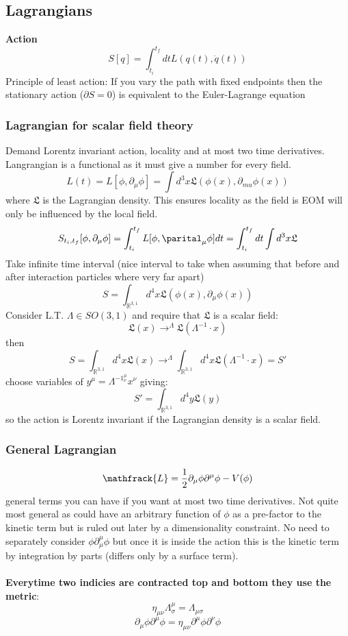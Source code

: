 \documentclass[12pt, a4paper, twoside, titlepage]{article}
\begin{document}
\subsection{Lagrangians}
\textbf{Action}
$$
S[q] = \int_{t_i}^{t_f} dt L(q(t),\dot q(t))
$$
Principle of least action: If you vary the path with fixed endpoints then the stationary action ($\partial S = 0$) is equivalent to the Euler-Lagrange equation
\subsubsection{Lagrangian for scalar field theory}
Demand Lorentz invariant action, locality and at most two time derivatives. Langrangian is a functional as it must give a number for every field.
$$
L(t) = L[\phi, \partial_{\mu} \phi] = \int d^3x \mathfrak{L}(\phi(x),\partial_{mu}\phi(x))
$$
where $\mathfrak{L}$ is the Lagrangian density. This ensures locality as the field is EOM will only be influenced by the local field.
$$
S_{t_i,t_f}[\phi, \partial_{\mu}\phi] = \int_{t_i}^{t_f} L[\phi, \parital_{\mu}\phi] dt = \int_{t_i}^{t_f} dt \int d^3x \mathfrak{L}
$$
Take infinite time interval (nice interval to take when assuming that before and after interaction particles where very far apart)
$$
S = \int_{\mathbb{R}^{3,1}} d^4x \mathfrak{L} (\phi(x), \partial_{\mu}\phi(x))
$$
Consider L.T. $\Lambda \in SO(3,1)$ and require that $\mathfrak{L}$ is a scalar field:
$$
\mathfrak{L}(x) \rightarrow^{\Lambda} \mathfrak{L}(\Lambda^{-1}\cdot x)
$$
then
$$
S =  \int_{\mathbb{R}^{3,1}} d^4x \mathfrak{L} (x) \rightarrow^{\Lambda}  \int_{\mathbb{R}^{3,1}} d^4x \mathfrak{L} (\Lambda^{-1} \cdot x) = S'
$$
choose variables of $y^{\mu} = \Lambda^{-1}^{\mu}_{\nu} x^{\nu}$ giving:
$$
S' = \int_{\mathbb{R}^{3,1}} d^4y \mathfrak{L} (y) 
$$
so the action is Lorentz invariant if the Lagrangian density is a scalar field.
\subsubsection{General Lagrangian}
\begin{equation}
        \mathfrack{L} = \frac{1}{2}\partial_{\mu}\phi \partial^{\mu} \phi - V(\phi)
\end{equation}
general terms you can have if you want at most two time derivatives. Not quite most general as could have an arbitrary function of $\phi$ as a pre-factor to the kinetic term but is ruled out later by a dimensionality constraint. No need to separately consider $\phi \partial_{\mu}^{\mu}\phi$ but once it is inside the action this is the kinetic term by integration by parts (differs only by a surface term).\\\\
\textbf{Everytime two indicies are contracted top and bottom they use the metric}:
$$
\eta_{\mu \nu}\Lambda^{\mu}_{\sigma} = \Lambda_{\mu \sigma}
$$
$$
\partial_{\mu}\phi \partial^{\mu} \phi  = \eta_{\mu \nu}\partial^{\mu}\phi \partial^{\nu} \phi 
$$
\end{document}
